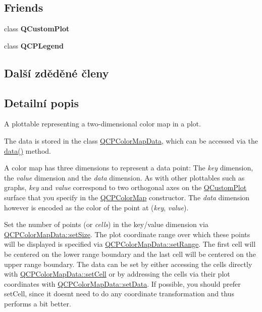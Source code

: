 \subsection*{Friends}
\begin{DoxyCompactItemize}
\item 
\hypertarget{classQCPColorMap_a1cdf9df76adcfae45261690aa0ca2198}{}class {\bfseries Q\+Custom\+Plot}\label{classQCPColorMap_a1cdf9df76adcfae45261690aa0ca2198}

\item 
\hypertarget{classQCPColorMap_a8429035e7adfbd7f05805a6530ad5e3b}{}class {\bfseries Q\+C\+P\+Legend}\label{classQCPColorMap_a8429035e7adfbd7f05805a6530ad5e3b}

\end{DoxyCompactItemize}
\subsection*{Další zděděné členy}


\subsection{Detailní popis}
A plottable representing a two-\/dimensional color map in a plot. 



The data is stored in the class \hyperlink{classQCPColorMapData}{Q\+C\+P\+Color\+Map\+Data}, which can be accessed via the \hyperlink{classQCPColorMap_a3ae12c9ce842352037cd20ea5267414f}{data()} method.

A color map has three dimensions to represent a data point\+: The {\itshape key} dimension, the {\itshape value} dimension and the {\itshape data} dimension. As with other plottables such as graphs, {\itshape key} and {\itshape value} correspond to two orthogonal axes on the \hyperlink{classQCustomPlot}{Q\+Custom\+Plot} surface that you specify in the \hyperlink{classQCPColorMap}{Q\+C\+P\+Color\+Map} constructor. The {\itshape data} dimension however is encoded as the color of the point at ({\itshape key}, {\itshape value}).

Set the number of points (or {\itshape cells}) in the key/value dimension via \hyperlink{classQCPColorMapData_a0d9ff35c299d0478b682bfbcdd9c097e}{Q\+C\+P\+Color\+Map\+Data\+::set\+Size}. The plot coordinate range over which these points will be displayed is specified via \hyperlink{classQCPColorMapData_aad9c1c7c703c1339489fc730517c83d4}{Q\+C\+P\+Color\+Map\+Data\+::set\+Range}. The first cell will be centered on the lower range boundary and the last cell will be centered on the upper range boundary. The data can be set by either accessing the cells directly with \hyperlink{classQCPColorMapData_a8e75eaf8746596319032a93f3d2d0683}{Q\+C\+P\+Color\+Map\+Data\+::set\+Cell} or by addressing the cells via their plot coordinates with \hyperlink{classQCPColorMapData_afd2083ccfd6987ec94aa7ef8e91ca39a}{Q\+C\+P\+Color\+Map\+Data\+::set\+Data}. If possible, you should prefer set\+Cell, since it doesn\textquotesingle{}t need to do any coordinate transformation and thus performs a bit better.

